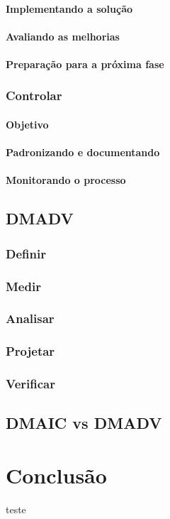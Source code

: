 \documentclass{abnt}
\begin{document}
					\subsubsection {Implementando a solução}
					\subsubsection {Avaliando as melhorias}
					\subsubsection {Preparação para a próxima fase}
				\subsection {Controlar}
					\subsubsection {Objetivo}
					\subsubsection {Padronizando e documentando}
					\subsubsection {Monitorando o processo}
			\section {DMADV}
				\subsection {Definir}
				\subsection {Medir}
				\subsection {Analisar}
				\subsection {Projetar}
				\subsection {Verificar}
			\section {DMAIC vs DMADV}
	
	\chapter {Conclusão}
	
	\begin{thebibliography}{99}
		 teste
	\end{thebibliography}
\end{document}
